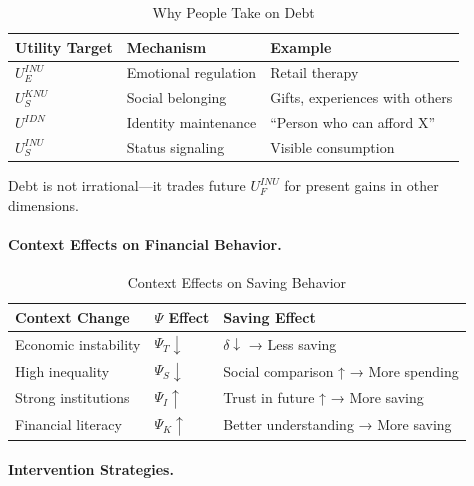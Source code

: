 {\begin{table}[htbp]
\centering
\caption{Why People Take on Debt}
\label{tab:debt-reasons}
\renewcommand{\arraystretch}{1.3}
\begin{tabular}{@{}lll@{}}
\toprule
\textbf{Utility Target} & \textbf{Mechanism} & \textbf{Example} \\
\midrule
$U^{INU}_E$ & Emotional regulation & Retail therapy \\
$U^{KNU}_S$ & Social belonging & Gifts, experiences with others \\
$U^{IDN}$ & Identity maintenance & ``Person who can afford X'' \\
$U^{INU}_S$ & Status signaling & Visible consumption \\
\bottomrule
\end{tabular}
\end{table}

Debt is not irrational---it trades future $U^{INU}_F$ for present gains 
in other dimensions.

\paragraph{Context Effects on Financial Behavior.}

\begin{table}[htbp]
\centering
\caption{Context Effects on Saving Behavior}
\label{tab:finance-context}
\renewcommand{\arraystretch}{1.3}
\begin{tabular}{@{}lll@{}}
\toprule
\textbf{Context Change} & \textbf{$\Psi$ Effect} & \textbf{Saving Effect} \\
\midrule
Economic instability & $\Psi_T \downarrow$ & $\delta \downarrow$ → Less saving \\
High inequality & $\Psi_S \downarrow$ & Social comparison ↑ → More spending \\
Strong institutions & $\Psi_I \uparrow$ & Trust in future ↑ → More saving \\
Financial literacy & $\Psi_K \uparrow$ & Better understanding → More saving \\
\bottomrule
\end{tabular}
\end{table}

\paragraph{Intervention Strategies.}

}
